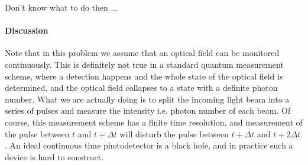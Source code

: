 \documentclass[hyperref, a4paper]{article}
\begin{document}
Don't know what to do then ...

\paragraph{Discussion} Note that in this problem we assume that an optical field can be monitored continuously.
This is definitely not true in a standard quantum measurement scheme, where a detection happens and the whole state of 
the optical field is determined, and the optical field collapses to a state with a definite photon number.
What we are actually doing is to split the incoming light beam into a series of pulses and measure the intensity 
i.e. photon number of each beam. Of course, this measurement scheme has a finite time resolution, and 
measurement of the pulse between $t$ and $t + \Delta t$ will disturb the pulse between $t + \Delta t$ and $t + 2 \Delta t$.
An ideal continuous time photodetector is a black hole, and in practice such a device is hard to construct.

\paragraph{}
\end{document}
